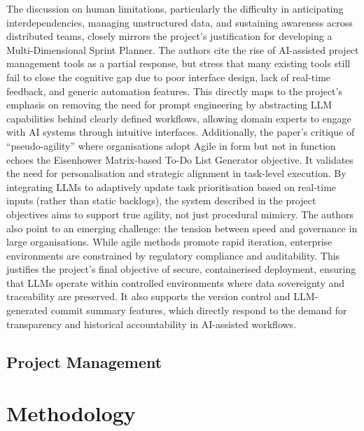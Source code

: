 \documentclass{report}
\begin{document}
The discussion on human limitations, particularly the difficulty in anticipating interdependencies, managing unstructured data, and sustaining awareness across distributed teams, closely mirrors the project’s justification for developing a Multi-Dimensional Sprint Planner. The authors cite the rise of AI-assisted project management tools as a partial response, but stress that many existing tools still fail to close the cognitive gap due to poor interface design, lack of real-time feedback, and generic automation features. This directly maps to the project’s emphasis on removing the need for prompt engineering by abstracting LLM capabilities behind clearly defined workflows, allowing domain experts to engage with AI systems through intuitive interfaces.
Additionally, the paper’s critique of “pseudo-agility” where organisations adopt Agile in form but not in function echoes the Eisenhower Matrix-based To-Do List Generator objective. It validates the need for personalisation and strategic alignment in task-level execution. By integrating LLMs to adaptively update task prioritisation based on real-time inputs (rather than static backlogs), the system described in the project objectives aims to support true agility, not just procedural mimicry.
The authors also point to an emerging challenge: the tension between speed and governance in large organisations. While agile methods promote rapid iteration, enterprise environments are constrained by regulatory compliance and auditability. This justifies the project’s final objective of secure, containerised deployment, ensuring that LLMs operate within controlled environments where data sovereignty and traceability are preserved. It also supports the version control and LLM-generated commit summary features, which directly respond to the demand for transparency and historical accountability in AI-assisted workflows.

\section{Project Management}

\chapter{Methodology}  %
\end{document}

